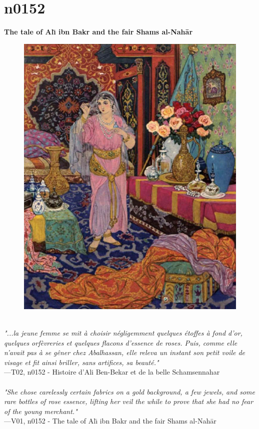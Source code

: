 \documentclass[../Carre_nights.tex]{subfiles}
\begin{document}
\newpage

\section{n0152}
\textbf{\Large{The tale of Al\={\i} ibn Bakr and the fair Shams al-Nah\=ar}} \\

\begin{figure}[ht]
\centering
\includegraphics[height=\figsize]{illustrations/volume_2/T02, n0152 - Histoire d'Ali Ben-Bekar et de la belle Schamsennahar.jpg}
\end{figure}

\textit{\\
"...la jeune femme se mit à choisir négligemment quelques étoffes à fond d’or, quelques orfèvreries et quelques flacons d’essence de roses. Puis, comme elle n’avait pas à se gêner chez Abalhassan, elle releva un instant son petit voile de visage et fit ainsi briller, sans artifices, sa beauté."} \\
—T02, n0152 - Histoire d'Ali Ben-Bekar et de la belle Schamsennahar \\~\\
\textit{"She chose carelessly certain fabrics on a gold background, a few jewels, and some rare bottles of rose essence, lifting her veil the while to prove that she had no fear of the young merchant."} \\
—V01, n0152 - The tale of Al\={\i} ibn Bakr and the fair Shams al-Nah\=ar
\end{document}
